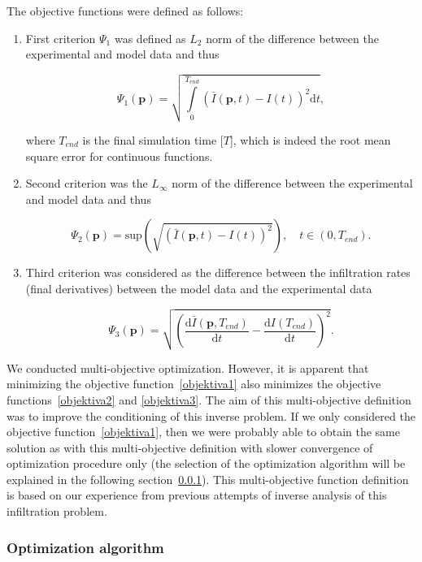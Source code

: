 \documentclass[review]{elsarticle}
\newenvironment{lineq}
    {\begin{linenomath*}
    \begin{equation}
    }
    { 
    \end{equation} 
    \end{linenomath*}
    }
\newcommand{\dd}{\mathrm{d}}
\renewcommand{\vec}{\mathbf}
\begin{document}
The objective functions were defined as follows:
\begin{enumerate}[label={\bf \Roman*}.]
\item First criterion $\Psi_1$ was defined as $L_2$ norm of the difference between the  experimental and model data and thus
\begin{lineq}
\label{objektiva1}
\Psi_1 (\vec{p}) = \sqrt{\int\limits_0^{T_{end}} \left( \bar{I}(\vec{p},t) - I(t) \right)^2 \dd t},
\end{lineq}
where $T_{end}$ is the final simulation time [$T$], which is indeed the root mean square error for continuous functions. 
\item Second criterion was the $L_{\infty}$ norm of the difference between the experimental and model data and thus
\begin{lineq}
\label{objektiva2}
\Psi_2 (\vec{p}) = \mathrm{sup} \left( \sqrt{\left( \bar{I}(\vec{p},t) - I(t) \right)^2} \right), \quad  t \in (0, T_{end}).
\end{lineq}
\item Third criterion was considered as the difference between the infiltration rates (final derivatives) between the model data and the experimental data
\begin{lineq}
\label{objektiva3}
\Psi_3 (\vec{p}) =  \sqrt{\left( \frac{\dd \bar{I}(\vec{p},T_{end})}{\dd t} - \frac{\dd I(T_{end})}{\dd t} \right)^2}.
\end{lineq}


\end{enumerate}

We conducted multi-objective optimization. However, it is apparent that minimizing the objective function~\eqref{objektiva1} also minimizes the objective functions~\eqref{objektiva2} and \eqref{objektiva3}. The aim of this multi-objective definition was to improve the conditioning of this inverse problem. If we only considered the objective function~\eqref{objektiva1}, then we were probably able to obtain the same solution as with this multi-objective definition with slower convergence of optimization procedure only (the selection of the optimization algorithm will be explained in the following section~\ref{optima}). This multi-objective function definition is based on our experience from previous attempts of inverse analysis of this infiltration problem.



\subsubsection{Optimization algorithm}%
\label{optima}
\end{document}
